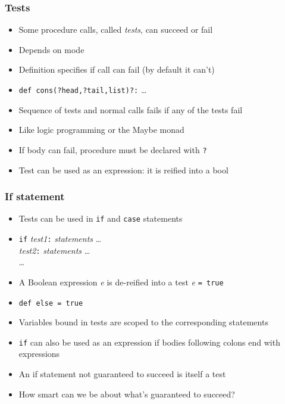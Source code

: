 \documentclass[12pt]{beamer}
\begin{document}
\begin{frame}
\frametitle{Tests}
\begin{itemize}
\item Some procedure calls, called \emph{tests}, can succeed or fail
\item Depends on mode
\item Definition specifies if call can fail (by default it can't)
\item \texttt{def cons(?head,?tail,list)?:} \ldots
\item Sequence of tests and normal calls fails if any of the tests fail
\item Like logic programming or the Maybe monad
\item If body can fail, procedure must be declared with \texttt{?}
\item Test can be used as an expression:  it is reified into a bool
\end{itemize}
\end{frame}


\begin{frame}
\frametitle{If statement}
\begin{itemize}
\item Tests can be used in \texttt{if} and \texttt{case} statements
\item \texttt{if} \emph{test1}\texttt{:} \emph{statements} \ldots \\
\hspace*{1em} \emph{test2}\texttt{:} \emph{statements} \ldots \\
\hspace*{1em} \ldots \\
\item A Boolean expression \emph{e} is de-reified into a test \emph{e}
  \texttt{= true}
\item \texttt{def else = true}
\item Variables bound in tests are scoped to the corresponding statements
\item \texttt{if} can also be used as an expression if bodies
  following colons end with expressions
\item An if statement not guaranteed to succeed is itself a test
\item How smart can we be about what's guaranteed to succeed?
\end{itemize}
\end{frame}
\end{document}
